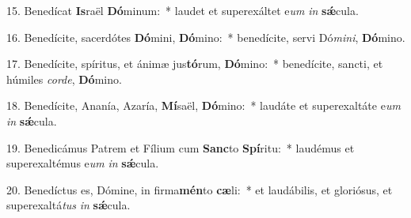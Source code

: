 15. Benedícat \textbf{Is}raël \textbf{Dó}minum:~* laudet et superexáltet e\textit{um} \textit{in} \textbf{s\'{\ae}}cula.

16. Benedícite, sacerdótes \textbf{Dó}mini, \textbf{Dó}mino:~* benedícite, servi Dó\textit{mi}\textit{ni}, \textbf{Dó}mino.

17. Benedícite, spíritus, et ánimæ jus\textbf{tó}rum, \textbf{Dó}mino:~* benedícite, sancti, et húmiles \textit{cor}\textit{de}, \textbf{Dó}mino.

18. Benedícite, Ananía, Azaría, \textbf{Mí}saël, \textbf{Dó}mino:~* laudáte et superexaltáte e\textit{um} \textit{in} \textbf{s\'{\ae}}cula.

19. Benedicámus Patrem et Fílium cum \textbf{Sanc}to \textbf{Spí}ritu:~* laudémus et superexaltémus e\textit{um} \textit{in} \textbf{s\'{\ae}}cula.

20. Benedíctus es, Dómine, in firma\textbf{mén}to \textbf{cæ}li:~* et laudábilis, et gloriósus, et superexaltá\textit{tus} \textit{in} \textbf{s\'{\ae}}cula.